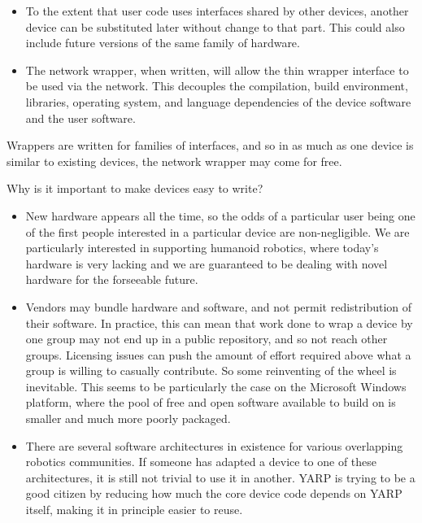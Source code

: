 \begin{itemize}

\item To the extent that user code uses interfaces shared by other
devices, another device can be substituted later without change to
that part.  This could also include future versions of the same family
of hardware.

\item The network wrapper, when written, will allow the thin wrapper
interface to be used via the network.  This decouples the compilation,
build environment, libraries, operating system, and language
dependencies of the device software and the user software.

\end{itemize}

Wrappers are written for families of interfaces, and so in as much
as one device is similar to existing devices, the network 
wrapper may come for free.

Why is it important to make devices easy to write?

\begin{itemize}

\item New hardware appears all the time, so the odds of a particular
user being one of the first people interested in a particular device are
non-negligible.  We are particularly interested in supporting humanoid
robotics, where today's hardware is very lacking and we are guaranteed
to be dealing with novel hardware for the forseeable future.

\item Vendors may bundle hardware and software, and not permit
redistribution of their software.  In practice, this can mean that
work done to wrap a device by one group may not end up in a public
repository, and so not reach other groups.  Licensing issues can push
the amount of effort required above what a group is willing to
casually contribute.  So some reinventing of the wheel is inevitable.
This seems to be particularly the case on the Microsoft Windows
platform, where the pool of free and open software available to build
on is smaller and much more poorly packaged.

\item There are several software architectures in existence for
various overlapping robotics communities.  If someone has adapted
a device to one of these architectures, it is still not trivial
to use it in another.  YARP is trying to be a good citizen by
reducing how much the core device code depends on YARP itself,
making it in principle easier to reuse.


\end{itemize}



